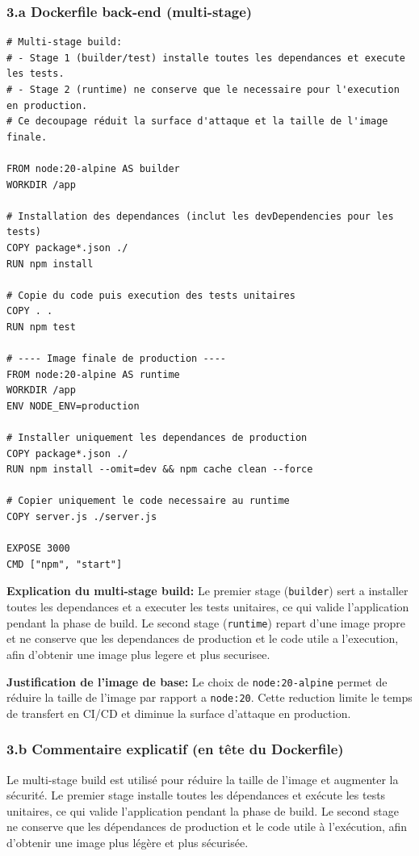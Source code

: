 \documentclass[11pt,a4paper]{article}
\begin{document}
\subsubsection*{3.a Dockerfile back-end (multi-stage)}
\begin{lstlisting}[language={},title=backend/Dockerfile]
# Multi-stage build:
# - Stage 1 (builder/test) installe toutes les dependances et execute les tests.
# - Stage 2 (runtime) ne conserve que le necessaire pour l'execution en production.
# Ce decoupage réduit la surface d'attaque et la taille de l'image finale.

FROM node:20-alpine AS builder
WORKDIR /app

# Installation des dependances (inclut les devDependencies pour les tests)
COPY package*.json ./
RUN npm install

# Copie du code puis execution des tests unitaires
COPY . .
RUN npm test

# ---- Image finale de production ----
FROM node:20-alpine AS runtime
WORKDIR /app
ENV NODE_ENV=production

# Installer uniquement les dependances de production
COPY package*.json ./
RUN npm install --omit=dev && npm cache clean --force

# Copier uniquement le code necessaire au runtime
COPY server.js ./server.js

EXPOSE 3000
CMD ["npm", "start"]
\end{lstlisting}

\noindent\textbf{Explication du multi-stage build:} Le premier stage (\texttt{builder}) sert a installer toutes les dependances et a executer les tests unitaires, ce qui valide l'application pendant la phase de build. Le second stage (\texttt{runtime}) repart d'une image propre et ne conserve que les dependances de production et le code utile a l'execution, afin d'obtenir une image plus legere et plus securisee.

\noindent\textbf{Justification de l'image de base:} Le choix de \texttt{node:20-alpine} permet de réduire la taille de l'image par rapport a \texttt{node:20}. Cette reduction limite le temps de transfert en CI/CD et diminue la surface d'attaque en production.

\subsubsection*{3.b Commentaire explicatif (en tête du Dockerfile)}
\noindent Le multi-stage build est utilisé pour réduire la taille de l'image et augmenter la sécurité. Le premier stage installe toutes les dépendances et exécute les tests unitaires, ce qui valide l'application pendant la phase de build. Le second stage ne conserve que les dépendances de production et le code utile à l'exécution, afin d'obtenir une image plus légère et plus sécurisée.
\end{document}
